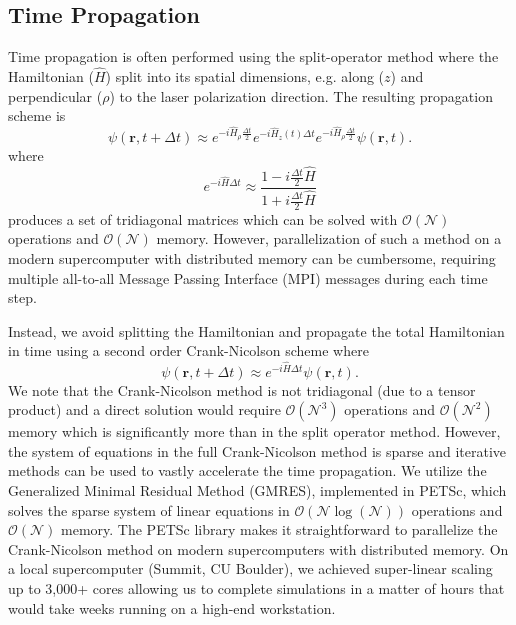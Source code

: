 \documentclass{article}
\begin{document}
\subsection{Time Propagation} %
\label{sub:time_propagation}
Time propagation is often performed using the split-operator method where the Hamiltonian ($\hat{H}$) split into its spatial dimensions, e.g. along ($z$) and perpendicular ($\rho$) to the laser polarization direction. The resulting propagation scheme is
%
\begin{equation}
    \psi(\mathbf{r},t+\Delta t) \approx e^{-i\hat{H}_{\rho}\frac{\Delta t}{2}} e^{-i\hat{H}_z(t)\Delta t} e^{-i\hat{H}_{\rho}\frac{\Delta t}{2}}\psi(\mathbf{r},t).
     \label{eq:Split-operator}
\end{equation}
%
where
\begin{equation}
    e^{-i\hat{H}\Delta t} \approx \frac{1-i\frac{\Delta t}{2} \hat{H}}{1+i\frac{\Delta t}{2} \hat{H}}
\end{equation}
produces a set of tridiagonal matrices which can be solved with $\mathcal{O}(\mathcal{N})$ operations and $\mathcal{O}(\mathcal{N})$ memory. However, parallelization of such a method on a modern supercomputer with distributed memory can be cumbersome, requiring multiple all-to-all Message Passing Interface (MPI) messages during each time step.

Instead, we avoid splitting the Hamiltonian and propagate the total Hamiltonian in time using a second order Crank-Nicolson scheme where
%
\begin{equation}
    \psi(\mathbf{r},t+\Delta t) \approx e^{-i\hat{H}\Delta t}\psi(\mathbf{r},t).
    \label{eq:Crank_Nicolson}
\end{equation}
%
We note that the Crank-Nicolson method is not tridiagonal (due to a tensor product) and a direct solution would require $\mathcal{O}(\mathcal{N}^3)$ operations and $\mathcal{O}(\mathcal{N}^2)$ memory which is significantly more than in the split operator method. However, the system of equations in the full Crank-Nicolson method is sparse and iterative methods can be used to vastly accelerate the time propagation. We utilize the Generalized Minimal Residual Method (GMRES), implemented in PETSc, which solves the sparse system of linear equations in $\mathcal{O}(\mathcal{N}\log(\mathcal{N}))$ operations and $\mathcal{O}(\mathcal{N})$ memory. The PETSc library makes it straightforward to parallelize the Crank-Nicolson method on modern supercomputers with distributed memory. On a local supercomputer (Summit, CU Boulder), we achieved super-linear scaling up to 3,000+ cores allowing us to complete simulations in a matter of hours that would take weeks running on a high-end workstation.
\end{document}

